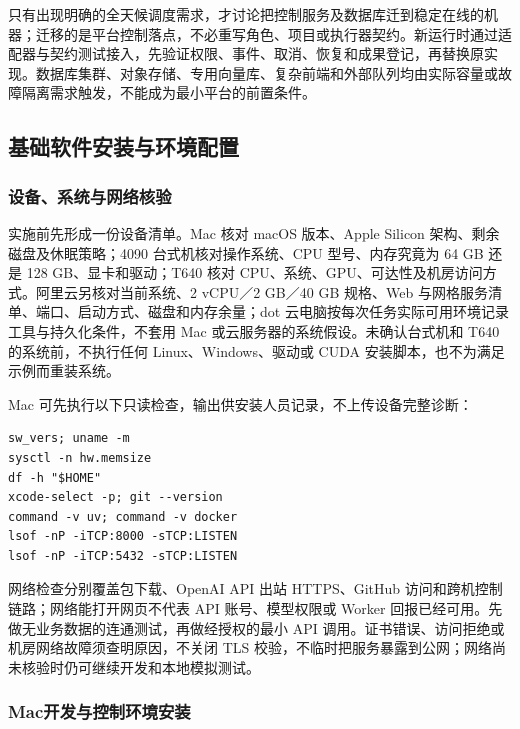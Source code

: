 \documentclass[11pt,a4paper]{article}
\begin{document}
只有出现明确的全天候调度需求，才讨论把控制服务及数据库迁到稳定在线的机器；迁移的是平台控制落点，不必重写角色、项目或执行器契约。新运行时通过适配器与契约测试接入，先验证权限、事件、取消、恢复和成果登记，再替换原实现。数据库集群、对象存储、专用向量库、复杂前端和外部队列均由实际容量或故障隔离需求触发，不能成为最小平台的前置条件。

\subsection{基础软件安装与环境配置}

\subsubsection{设备、系统与网络核验}

实施前先形成一份设备清单。Mac 核对 macOS 版本、Apple Silicon 架构、剩余磁盘及休眠策略；4090 台式机核对操作系统、CPU 型号、内存究竟为 64 GB 还是 128 GB、显卡和驱动；T640 核对 CPU、系统、GPU、可达性及机房访问方式。阿里云另核对当前系统、2 vCPU／2 GB／40 GB 规格、Web 与网格服务清单、端口、启动方式、磁盘和内存余量；dot 云电脑按每次任务实际可用环境记录工具与持久化条件，不套用 Mac 或云服务器的系统假设。未确认台式机和 T640 的系统前，不执行任何 Linux、Windows、驱动或 CUDA 安装脚本，也不为满足示例而重装系统。

Mac 可先执行以下只读检查，输出供安装人员记录，不上传设备完整诊断：
\par\noindent\begin{minipage}{\linewidth}
\begin{lstlisting}
sw_vers; uname -m
sysctl -n hw.memsize
df -h "$HOME"
xcode-select -p; git --version
command -v uv; command -v docker
lsof -nP -iTCP:8000 -sTCP:LISTEN
lsof -nP -iTCP:5432 -sTCP:LISTEN
\end{lstlisting}
\end{minipage}\par


网络检查分别覆盖包下载、OpenAI API 出站 HTTPS、GitHub 访问和跨机控制链路；网络能打开网页不代表 API 账号、模型权限或 Worker 回报已经可用。先做无业务数据的连通测试，再做经授权的最小 API 调用。证书错误、访问拒绝或机房网络故障须查明原因，不关闭 TLS 校验，不临时把服务暴露到公网；网络尚未核验时仍可继续开发和本地模拟测试。

\subsubsection{Mac开发与控制环境安装}
\end{document}
